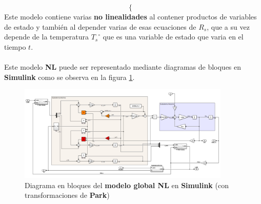 \documentclass[10pt]{article}
\begin{document}
\begin{enumerate}
\begin{itemize}
\begin{equation}
\begin{cases}
			\end{cases}
		\end{equation}
		Este modelo contiene varias \textbf{no linealidades} al contener productos de variables de estado y también al depender varias de esas ecuaciones de $R_{s}$, que a su vez depende de la temperatura ${T_{s}}^{\circ}$ que es una variable de estado que varia en el tiempo $t$.
		\\
		\\
		Este modelo \textbf{NL} puede ser representado mediante diagramas de bloques en \textbf{Simulink} como se observa en la figura \ref{fig:sistGlobalNL}.
		\begin{figure}[h!]
			\centering
			\includegraphics[width=0.9\textwidth]{2_1_2_ModeloGlobalNL.png}
			\caption{\label{fig:sistGlobalNL} Diagrama en bloques del \textbf{modelo global NL} en \textbf{Simulink} (con transformaciones de \textbf{Park})}
		\end{figure}


\end{itemize}
\end{enumerate}
\end{document}
